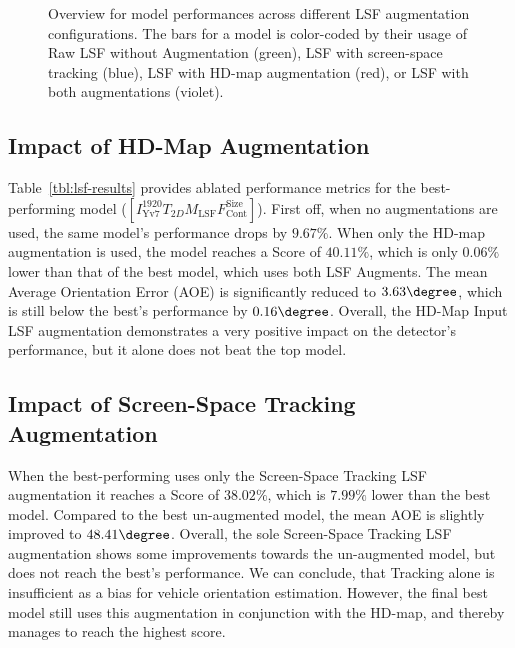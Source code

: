 \begin{figure}[htb]
    
    \caption{Overview for model performances across different LSF augmentation configurations. The bars for a model is color-coded by their usage of Raw LSF without Augmentation (green), LSF with screen-space tracking (blue), LSF with HD-map augmentation (red), or LSF with both augmentations (violet). }
    \label{fig:lsf-augmentations-overview}
\end{figure}

\subsection{Impact of HD-Map Augmentation}
\label{subsec:impactmap}

Table~\ref{tbl:lsf-results} provides ablated performance metrics for the best-performing model ($\left[I^{1920}_\text{Yv7}T_{2D}M_\text{LSF}F_\text{Cont}^\text{Size}\right]$). First off, when no augmentations are used, the same model's performance drops by $9.67\%$.
When only the HD-map augmentation is used, the model reaches a Score of $40.11\%$, which is only $0.06\%$ lower than that of the best model, which uses both LSF Augments.
The mean Average Orientation Error (AOE) is significantly reduced to $3.63\degree$, which is still below the best's performance by $0.16\degree$.
Overall, the HD-Map Input LSF augmentation demonstrates a very positive impact on the detector's performance, but it alone does not beat the top model.

\subsection{Impact of Screen-Space Tracking Augmentation}
\label{subsec:impactlsf}

When the best-performing uses only the Screen-Space Tracking LSF augmentation it reaches a Score of $38.02\%$, which is $7.99\%$ lower than the best model.
Compared to the best un-augmented model, the mean AOE is slightly improved to $48.41\degree$.
Overall, the sole Screen-Space Tracking LSF augmentation shows some improvements towards the un-augmented model, but does not reach the best's performance.
We can conclude, that Tracking alone is insufficient as a bias for vehicle orientation estimation.
However, the final best model still uses this augmentation in conjunction with the HD-map, and thereby manages to reach the highest score.


